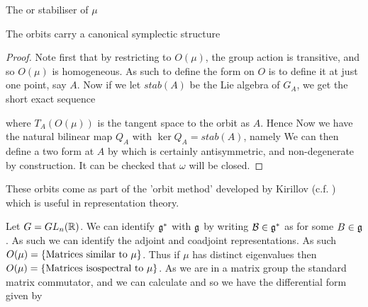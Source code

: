 \documentclass{article}
\begin{document}
\begin{definition}
The  or stabiliser of $\mu$
\end{definition}

\begin{prop}
The orbits carry a canonical symplectic structure
\end{prop}
\begin{proof}
Note first that by restricting to $O(\mu)$, the group action is transitive, and so $O(\mu)$ is homogeneous. As such to define the form on $O$ is to define it at just one point, say $A$. Now if we let $stab(A)$ be the Lie algebra of $G_A$, we get the short exact sequence 
\begin{center}
\end{center}
where $T_A(O(\mu))$ is the tangent space to the orbit as $A$. Hence 
Now we have the natural bilinear map $Q_A$ with $\ker Q_A = stab(A)$, namely
We can then define a two form at $A$ by 
which is certainly antisymmetric, and non-degenerate by construction. It can be checked that $\omega$ will be closed. 
\end{proof}

\begin{remark}
These orbits come as part of the 'orbit method' developed by Kirillov (c.f. \cite{Kirillov1999MeritsMethod}) which is useful in representation theory. 
\end{remark}

\begin{example}
Let $G = GL_n(\mathbb{R})$. We can identify $\mathfrak{g}^\ast$ with $\mathfrak{g}$ by writing $\mathcal{B}\in \mathfrak{g}^\ast$ as 
for some $B \in \mathfrak{g}$. As such we can identify the adjoint and coadjoint representations. As such $O(\mu) = \left\{ \text{Matrices similar to }\mu \right\}$. Thus if $\mu$ has distinct eigenvalues then $O(\mu) = \left\{ \text{Matrices isospectral to }\mu \right\}$. As we are in a matrix group 
the standard matrix commutator, and we can calculate
and so we have the differential form given by 
\end{example}
\end{document}
